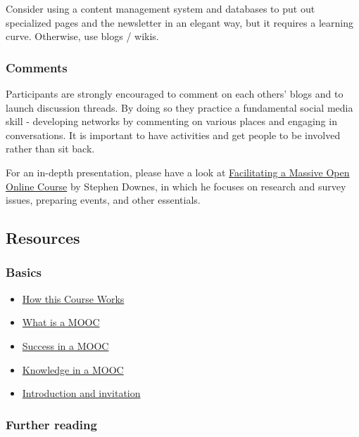 Consider using a content management system and databases to put out
specialized pages and the newsletter in an elegant way, but it requires
a learning curve. Otherwise, use blogs / wikis.

\subsubsection{Comments}

Participants are strongly encouraged to comment on each others' blogs
and to launch discussion threads. By doing so they practice a
fundamental social media skill - developing networks by commenting on
various places and engaging in conversations. It is important to have
activities and get people to be involved rather than sit back.

For an in-depth presentation, please have a look at
\href{http://www.downes.ca/presentation/290}{Facilitating a Massive Open
Online Course} by Stephen Downes, in which he focuses on research and
survey issues, preparing events, and other essentials.

\subsection{Resources}

\subsubsection{Basics}

\begin{itemize}
\item
  \href{http://change.mooc.ca/how.htm}{How this Course Works}
\item
  \href{http://www.youtube.com/watch?v=eW3gMGqcZQc}{What is a MOOC}
\item
  \href{http://www.youtube.com/watch?v=r8avYQ5ZqM0}{Success in a MOOC}
\item
  \href{http://www.youtube.com/watch?v=bWKdhzSAAG0}{Knowledge in a MOOC}
\item
  \href{http://www.youtube.com/watch?v=mqnyhLfNH3I}{Introduction and
  invitation}
\end{itemize}
\subsubsection{Further reading}

